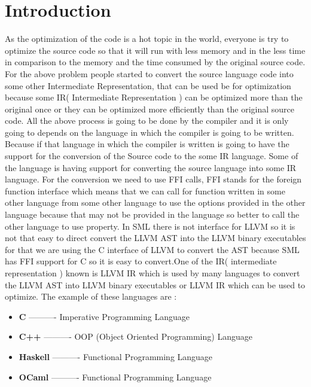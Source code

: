 \documentclass[openany]{book}
\begin{document}
\chapter{Introduction}
   \Large
   As the optimization of the code is a hot topic in the world, everyone is try to optimize the source code so that it will run with less memory and in the less time in comparison to the memory and the time consumed by the original source code. For the above problem  people started to convert the source language code into some other Intermediate Representation, that can be used be for optimization because some IR( Intermediate Representation ) can be optimized more than the original once or they can be optimized more efficiently than the original source code. All the above process is going to be done by the compiler and it is only going to depends on the language in which the compiler is going to be written. Because if that language in which the compiler is written is going to have the support for the conversion of the Source code to the some IR language. Some of the language is having support for converting the source language into some IR language. \newline \newline For the conversion we need to use FFI calls, FFI stands for the foreign function interface which means that we can call for function written in some other language from some other language to use the options provided in the other language because that may not be provided in the language so better to call the other language to use property. In SML there is not interface for LLVM so it is not that easy to direct convert the LLVM AST into the LLVM binary executables for that we are using the C interface of LLVM to convert the AST because SML has FFI support for C so it is easy to convert.\newline \newline One of the IR( intermediate representation ) known is LLVM IR which is used by many languages to convert the LLVM AST into LLVM binary executables or LLVM IR which can be used  to optimize.  The example of these languages are :\newline \newline \begin{itemize}
   	\item \textbf{C} ---------- Imperative Programming Language
   	\item \textbf{C++} ---------- OOP (Object Oriented Programming) Language
   	\item \textbf{Haskell} ---------- Functional Programming Language
   	\item \textbf{OCaml} ---------- Functional Programming Language\newline \newline
   \end{itemize}
\end{document}
